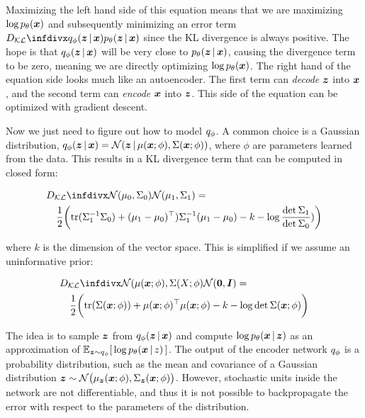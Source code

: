 Maximizing the left hand side of this equation means that we are maximizing $\log{p_{\theta}(\boldsymbol{x})}$ and subsequently minimizing an error term $\KL{\qphi \given{\vz}{\vx}}{\ptheta \given{\vz}{\vx}}$ since the KL divergence is always positive. The hope is that $\qphi \given{\vz}{\vx}$ will be very close to $\ptheta \given{\vz}{\vx}$, causing the divergence term to be zero, meaning we are directly optimizing $\log p_{\theta}(\boldsymbol{x})$. The right hand of the equation side looks much like an autoencoder. The first term can \emph{decode} $\boldsymbol{z}$ into $\boldsymbol{x}$, and the second term can \emph{encode} $\boldsymbol{x}$ into $\boldsymbol{z}$. This side of the equation can be optimized with gradient descent.

Now we just need to figure out how to model $q_{\phi}$. A common choice is a Gaussian distribution, $\qphi \given{\vz}{\vx} = \mathcal{N}\given{\vz}{\mu (\vx;\phi), \Sigma(\vx; \phi)}$, where $\phi$ are parameters learned from the data. This results in a KL divergence term that can be computed in closed form:

\begin{align}
\nonumber \lefteqn{\KL{\mathcal{N}(\mu_0, \Sigma_0)}{\mathcal{N}(\mu_1, \Sigma_1)} =} \\
& & \frac{1}{2} \bigg{(} \text{tr}(\Sigma_1^{-1}\Sigma_0) + (\mu_1 - \mu_0)^\top)\Sigma_1^{-1}(\mu_1 - \mu_0) - k - \log \frac{\det \Sigma_1}{\det \Sigma_0}) \bigg{)}
\label{kl-closed-form-eq1}
\end{align}

where $k$ is the dimension of the vector space. This is simplified if we assume an uninformative prior:

\begin{align}
\nonumber \lefteqn{ \KL{\mathcal{N}(\mu (\vx; \phi), \Sigma (X; \phi)}{ \mathcal{N}(\vec{0}, \vec{I})} =}\\
& & \frac{1}{2} \bigg{(} \text{tr}(\Sigma (\vx; \phi)) + \mu (\vx; \phi)^\top \mu (\vx; \phi) - k - \log{\det{\Sigma (\vx; \phi)}} \bigg{)}
\label{kl-closed-form-eq2}
\end{align}

The idea is to sample $\boldsymbol{z}$ from $\qphi \given{\vz}{\vx}$ and compute $\log{ p_\theta \given{\vx}{\vz}}$ as an approximation of $\E_{\vz \sim \qphi} [\,\log{\ptheta \given{\vx}{z}}\,]$. The output of the encoder network $q_{\phi}$ is a probability distribution, such as the mean and covariance of a Gaussian distribution $\boldsymbol{z} \sim \mathcal{N}\big(\mu_{\boldsymbol{z}} (\boldsymbol{x}; \phi), \Sigma_{\boldsymbol{z}} (\boldsymbol{x}; \phi)\big)$. However, stochastic units inside the network are not differentiable, and thus it is not possible to backpropagate the error with respect to the parameters of the distribution.

